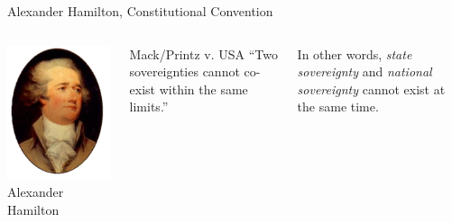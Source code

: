 \begin{frame}{Alexander Hamilton, Constitutional Convention}
    \begin{columns}[onlytextwidth]
            \centering
            \includegraphics[height=0.75\textheight]{img/hamilton.png} \\
            Alexander Hamilton \\

            \begin{block}{Mack/Printz v. USA}
                ``Two sovereignties cannot co-exist within the same limits.''
            \end{block}
            \pause
            \vspace{15pt}
            In other words, \emph{state sovereignty} and \emph{national sovereignty} cannot exist at the same time.
    \end{columns}
\end{frame}

